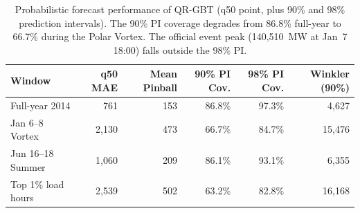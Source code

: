 \begin{table}[htbp]
\centering
\caption{Probabilistic forecast performance of QR-GBT (q50 point, plus 90\% and 98\% prediction intervals). The 90\% PI coverage degrades from 86.8\% full-year to 66.7\% during the Polar Vortex. The official event peak (140,510~MW at Jan~7 18:00) falls outside the 98\% PI.}
\label{tab:prob_metrics}
\begin{tabular}{lrrrrr}
\toprule
Window & q50 MAE & Mean Pinball & 90\% PI Cov. & 98\% PI Cov. & Winkler (90\%) \\
\midrule
Full-year 2014 & 761 & 153 & 86.8\% & 97.3\% & 4,627 \\
Jan 6--8 Vortex & 2,130 & 473 & 66.7\% & 84.7\% & 15,476 \\
Jun 16--18 Summer & 1,060 & 209 & 86.1\% & 93.1\% & 6,355 \\
Top 1\% load hours & 2,539 & 502 & 63.2\% & 82.8\% & 16,168 \\
\bottomrule
\end{tabular}
\end{table}